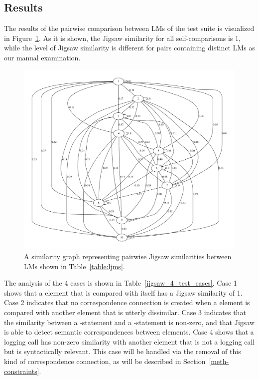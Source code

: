 \subsection{Results}  \label{study1-results}
The results of the pairwise comparison between LMs of the test suite is visualized in Figure~\ref{fig:jigsaw_graph}. As it is shown, the Jigsaw similarity for all self-comparisons is 1, while  the level of Jigsaw similarity is different for pairs containing distinct LMs as our manual examination.

\begin{figure} [H]
  \centering\includegraphics [width = \textwidth]{graphviz/jigsaw.pdf}
  \caption{A similarity graph representing pairwise Jigsaw similarities between LMs shown in Table~\ref{table:ljms}.}
  \label{fig:jigsaw_graph}
\end{figure}


The analysis of the 4 cases is shown in Table~\ref{jigsaw_4_test_cases}. Case 1 shows that a  element that is compared with itself has a Jigsaw similarity of 1. Case 2 indicates that no correspondence connection is created when a  element is compared with another  element that is utterly dissimilar. Case 3 indicates that the similarity between a -statement and a -statement is non-zero, and that Jigsaw is able to detect semantic correspondences between  elements. Case 4 shows that a logging call has non-zero similarity with another  element that is not a logging call but is syntactically relevant. This case will be handled via the removal of this kind of correspondence connection, as will be described in Section~\ref{meth-constraints}. 

